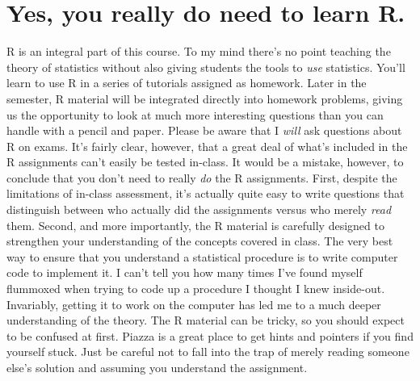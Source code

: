 \documentclass[12pt,letterpaper]{article}
\begin{document}
\section{Yes, you really do need to learn R.}
R is an integral part of this course. To my mind there's no point teaching the theory of statistics without also giving students the tools to \emph{use} statistics. You'll learn to use R in a series of tutorials assigned as homework. Later in the semester, R material will be integrated directly into homework problems, giving us the opportunity to look at much more interesting questions than you can handle with a pencil and paper.  Please be aware that I \emph{will} ask questions about R on exams. It's fairly clear, however, that a great deal of what's included in the R assignments can't easily be tested in-class. It would be a mistake, however, to conclude that you don't need to really \emph{do} the R assignments. First, despite the limitations of in-class assessment, it's actually quite easy to write questions that distinguish between who actually did the assignments versus who merely \emph{read} them. Second, and more importantly, the R material is carefully designed to strengthen your understanding of the concepts covered in class. The very best way to ensure that you understand a statistical procedure is to write computer code to implement it. I can't tell you how many times I've found myself flummoxed when trying to code up a procedure I thought I knew inside-out. Invariably, getting it to work on the computer has led me to a much deeper understanding of the theory. The R material can be tricky, so you should expect to be confused at first. Piazza is a great place to get hints and pointers if you find yourself stuck. Just be careful not to fall into the trap of merely reading someone else's solution and assuming you understand the assignment.

 
\end{document}
